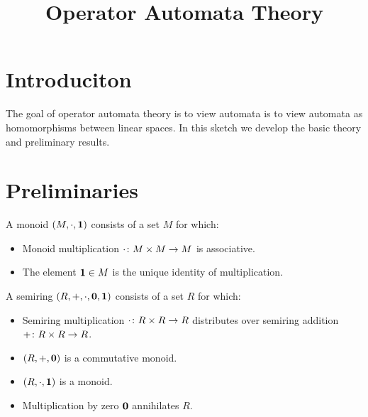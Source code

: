 \documentclass[12pt]{article}
\title{Operator Automata Theory}
\date{}
\begin{document}
\maketitle

\section{Introduciton}

The goal of operator automata theory is to view automata is to
view automata as homomorphisms between linear spaces.
In this sketch we develop the basic theory and preliminary results.


\section{Preliminaries}

\begin{definition}[Monoid]
  A monoid \(\left(M, \cdot, \mathbf{1}\right)\) consists of a set \(M\) for which:
  \begin{itemize}
    \item
      Monoid multiplication
      \(\cdot \colon M \times M \to M\) is associative.

    \item
      The element \(\mathbf{1} \in M\) is the unique identity of multiplication.
  \end{itemize}
\end{definition}

\begin{definition}[Semiring]
  A semiring \(\left(R, +, \cdot, \mathbf{0}, \mathbf{1}\right)\) consists of a set \(R\)
  for which:
  \begin{itemize}
    \item
      Semiring multiplication \(\cdot \colon R \times R \to R\)
      distributes over semiring addition \(+ \colon R \times R \to R\).

    \item
      \(\left(R, +, \mathbf{0}\right)\) is a commutative monoid.

    \item
      \(\left(R, \cdot, \mathbf{1}\right)\) is a monoid.

    \item
      Multiplication by zero \(\mathbf{0}\) annihilates \(R\).
  \end{itemize}
\end{definition}
\end{document}
